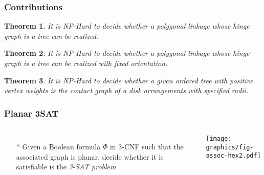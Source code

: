 \documentclass{beamer}
\newtheorem{thm}{Theorem}
\begin{document}
\begin{frame}\frametitle{Contributions}
     \begin{thm}
     It is NP-Hard to decide whether a polygonal linkage whose hinge graph is a \textit{tree} can be realized.
     \end{thm}
    \begin{thm} It is NP-Hard to decide whether a polygonal linkage whose hinge graph is a \textit{tree} can be realized with fixed orientation.
    \end{thm}
    \begin{thm} It is NP-Hard to decide whether a given ordered tree with positive vertex weights is the contact graph of a disk arrangements with specified radii.
    \end{thm}
\end{frame}
\begin{frame} \frametitle{Planar 3SAT}
    \begin{columns}[c]
        \begin{itemize}
            \item[*] Given a Boolean formula $\Phi$ in 3-CNF such that the associated graph is planar, decide whether it 
is satisfiable is the \textit{3-SAT problem}.
        \end{itemize}
        \begin{minipage}{\linewidth}
            \begin{center}
            \texttt{[image: graphics/fig-assoc-hex2.pdf]}
            \end{center}
        \end{minipage}
    \end{columns}
\end{frame}
\end{document}
